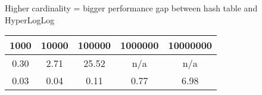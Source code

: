 \documentclass[11pt]{article}
\begin{document}
Higher cardinality = bigger performance gap between hash table and HyperLogLog

\begin{center}
\begin{tabular} { |c|c|c|c|c| }
\hline
1000 & 10000 & 100000 & 1000000 & 10000000 \\ [0.5ex]
\hline
0.30 & 2.71 & 25.52 & n/a & n/a \\
0.03 & 0.04 & 0.11 & 0.77 & 6.98 \\
\hline
\end{tabular}
\end{center}
\end{document}
